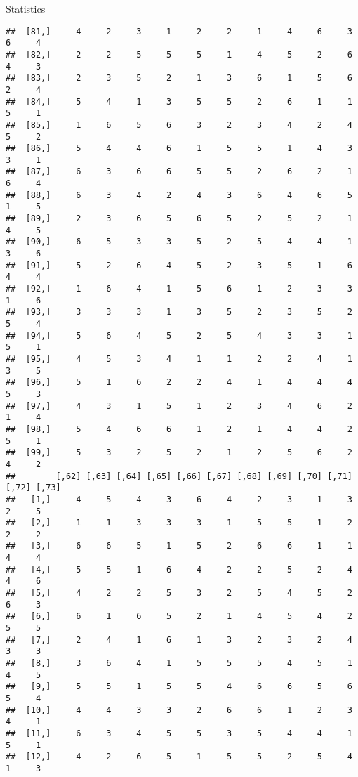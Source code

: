 \documentclass[
  ignorenonframetext,
]{beamer}
\begin{document}
\begin{frame}[fragile]{Statistics}
\begin{verbatim}
##  [81,]     4     2     3     1     2     2     1     4     6     3     6     4
##  [82,]     2     2     5     5     5     1     4     5     2     6     4     3
##  [83,]     2     3     5     2     1     3     6     1     5     6     2     4
##  [84,]     5     4     1     3     5     5     2     6     1     1     5     1
##  [85,]     1     6     5     6     3     2     3     4     2     4     5     2
##  [86,]     5     4     4     6     1     5     5     1     4     3     3     1
##  [87,]     6     3     6     6     5     5     2     6     2     1     6     4
##  [88,]     6     3     4     2     4     3     6     4     6     5     1     5
##  [89,]     2     3     6     5     6     5     2     5     2     1     4     5
##  [90,]     6     5     3     3     5     2     5     4     4     1     3     6
##  [91,]     5     2     6     4     5     2     3     5     1     6     4     4
##  [92,]     1     6     4     1     5     6     1     2     3     3     1     6
##  [93,]     3     3     3     1     3     5     2     3     5     2     5     4
##  [94,]     5     6     4     5     2     5     4     3     3     1     5     1
##  [95,]     4     5     3     4     1     1     2     2     4     1     3     5
##  [96,]     5     1     6     2     2     4     1     4     4     4     5     3
##  [97,]     4     3     1     5     1     2     3     4     6     2     1     4
##  [98,]     5     4     6     6     1     2     1     4     4     2     5     1
##  [99,]     5     3     2     5     2     1     2     5     6     2     4     2
##        [,62] [,63] [,64] [,65] [,66] [,67] [,68] [,69] [,70] [,71] [,72] [,73]
##   [1,]     4     5     4     3     6     4     2     3     1     3     2     5
##   [2,]     1     1     3     3     3     1     5     5     1     2     2     2
##   [3,]     6     6     5     1     5     2     6     6     1     1     4     4
##   [4,]     5     5     1     6     4     2     2     5     2     4     4     6
##   [5,]     4     2     2     5     3     2     5     4     5     2     6     3
##   [6,]     6     1     6     5     2     1     4     5     4     2     5     5
##   [7,]     2     4     1     6     1     3     2     3     2     4     3     3
##   [8,]     3     6     4     1     5     5     5     4     5     1     4     5
##   [9,]     5     5     1     5     5     4     6     6     5     6     5     4
##  [10,]     4     4     3     3     2     6     6     1     2     3     4     1
##  [11,]     6     3     4     5     5     3     5     4     4     1     5     1
##  [12,]     4     2     6     5     1     5     5     2     5     4     1     3

\end{verbatim}
\end{frame}
\end{document}
